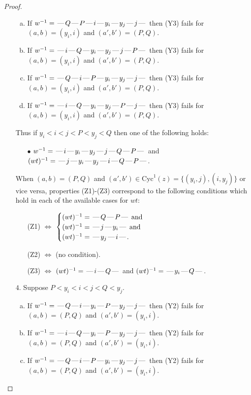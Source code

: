\documentclass[10pt]{article}
\theoremstyle{definition}
\theoremstyle{definition}
\def\dash{\text{\hspace{0.5mm}---\hspace{0.5mm}}}
\def\Cyc{\mathrm{Cyc}}
\begin{document}
\begin{proof}
\begin{enumerate}
\begin{enumerate}[(a)]
\item If $w^{-1} = \dash Q\dash P\dash i\dash y_i\dash y_j\dash j\dash $ then (Y3) fails for $(a,b)=(y_i,i)$ and $(a',b')=(P,Q)$.
\item If $w^{-1} = \dash i\dash Q\dash y_i\dash y_j\dash j\dash P\dash $ then (Y3) fails for $(a,b)=(y_i,i)$ and $(a',b')=(P,Q)$.
\item If $w^{-1} = \dash Q\dash i\dash P\dash y_i\dash y_j\dash j\dash $ then (Y3) fails for $(a,b)=(y_i,i)$ and $(a',b')=(P,Q)$.
\item If $w^{-1} = \dash i\dash Q\dash y_i\dash y_j\dash P\dash j\dash $ then (Y3) fails for $(a,b)=(y_i,i)$ and $(a',b')=(P,Q)$.
\end{enumerate}
Thus if $y_i < i < j < P < y_j < Q$ then one of the following holds:
\begin{enumerate}
\item[$\bullet$] $w^{-1} = \dash i\dash y_i\dash y_j\dash j\dash Q\dash P\dash $ and $(wt)^{-1} = \dash j\dash y_i\dash y_j\dash i\dash Q\dash P\dash $.
\end{enumerate}
When $(a,b)= (P,Q)$ and $(a',b')\in \Cyc^1(z)=\{(y_i,j),(i,y_j)\}$ or vice versa,
properties (Z1)-(Z3) correspond to the following conditions which
hold in each of the available cases for $wt$:
\begin{enumerate}
\item[](Z1) $\Leftrightarrow$ $\begin{cases}\text{$(wt)^{-1} = \dash Q \dash P \dash$}\text{ and }\\
\text{$(wt)^{-1} = \dash j \dash y_i \dash$}\text{ and }\\
\text{$(wt)^{-1} = \dash y_j \dash i \dash$}.\end{cases}$
\item[](Z2) $\Leftrightarrow$ (no condition).
\item[](Z3) $\Leftrightarrow$ $(wt)^{-1} = \dash i \dash Q \dash$  and $(wt)^{-1} = \dash y_i \dash Q \dash$.
\end{enumerate}
\item[$4$.] Suppose $P < y_i < i < j < Q < y_j$.
\begin{enumerate}[(a)]
\item If $w^{-1} = \dash Q\dash i\dash y_i\dash P\dash y_j\dash j\dash $ then (Y2) fails for $(a,b)=(P,Q)$ and $(a',b')=(y_i,i)$.
\item If $w^{-1} = \dash i\dash Q\dash y_i\dash P\dash y_j\dash j\dash $ then (Y2) fails for $(a,b)=(P,Q)$ and $(a',b')=(y_i,i)$.
\item If $w^{-1} = \dash Q\dash i\dash P\dash y_i\dash y_j\dash j\dash $ then (Y2) fails for $(a,b)=(P,Q)$ and $(a',b')=(y_i,i)$.

\end{enumerate}
\end{enumerate}
\end{proof}
\end{document}
